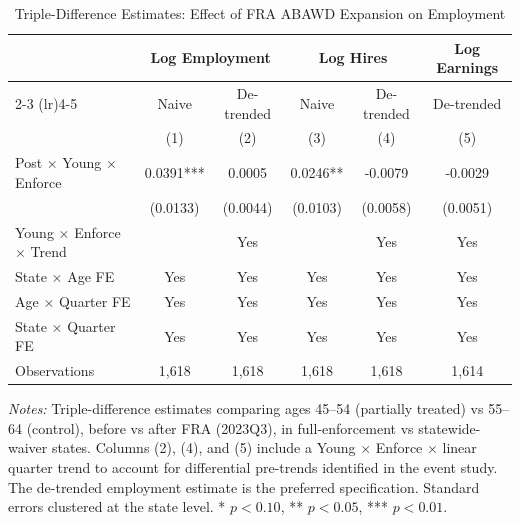 \begin{table}[htbp]
\centering
\caption{Triple-Difference Estimates: Effect of FRA ABAWD Expansion on Employment}
\label{tab:ddd}
\begin{threeparttable}
\small
\begin{tabular}{lccccc}
\toprule
 & \multicolumn{2}{c}{Log Employment} & \multicolumn{2}{c}{Log Hires} & Log Earnings \\
\cmidrule(lr){2-3} \cmidrule(lr){4-5}
 & Naive & De-trended & Naive & De-trended & De-trended \\
 & (1) & (2) & (3) & (4) & (5) \\
\midrule
Post $\times$ Young $\times$ Enforce & 0.0391*** & 0.0005 & 0.0246** & -0.0079 & -0.0029 \\
 & (0.0133) & (0.0044) & (0.0103) & (0.0058) & (0.0051) \\
[6pt]
Young $\times$ Enforce $\times$ Trend & & Yes & & Yes & Yes \\
State $\times$ Age FE & Yes & Yes & Yes & Yes & Yes \\
Age $\times$ Quarter FE & Yes & Yes & Yes & Yes & Yes \\
State $\times$ Quarter FE & Yes & Yes & Yes & Yes & Yes \\
Observations & 1,618 & 1,618 & 1,618 & 1,618 & 1,614 \\
\bottomrule
\end{tabular}
\begin{tablenotes}[flushleft]
\small
\item \textit{Notes:} Triple-difference estimates comparing ages 45--54 (partially treated) vs 55--64 (control), before vs after FRA (2023Q3), in full-enforcement vs statewide-waiver states. Columns (2), (4), and (5) include a Young $\times$ Enforce $\times$ linear quarter trend to account for differential pre-trends identified in the event study. The de-trended employment estimate is the preferred specification. Standard errors clustered at the state level. * $p<0.10$, ** $p<0.05$, *** $p<0.01$.
\end{tablenotes}
\end{threeparttable}
\end{table}
